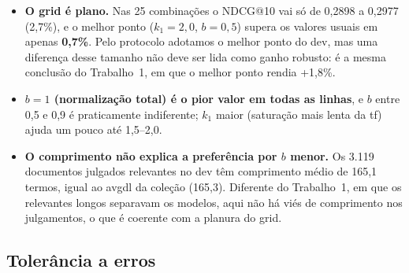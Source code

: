\documentclass[10pt,a4paper]{article}
\begin{document}
\begin{itemize}
\item \textbf{O grid é plano.} Nas 25 combinações o NDCG@10 vai só de 0,2898 a 0,2977 (2,7\%), e o melhor ponto ($k_1 = 2{,}0$, $b = 0{,}5$) supera os valores usuais em apenas \textbf{0,7\%}. Pelo protocolo adotamos o melhor ponto do dev, mas uma diferença desse tamanho não deve ser lida como ganho robusto: é a mesma conclusão do Trabalho~1, em que o melhor ponto rendia +1,8\%.
\item \textbf{$b = 1$ (normalização total) é o pior valor em todas as linhas}, e $b$ entre 0,5 e 0,9 é praticamente indiferente; $k_1$ maior (saturação mais lenta da tf) ajuda um pouco até 1,5--2,0.
\item \textbf{O comprimento não explica a preferência por $b$ menor.} Os 3.119 documentos julgados relevantes no dev têm comprimento médio de 165,1 termos, igual ao avgdl da coleção (165,3). Diferente do Trabalho~1, em que os relevantes longos separavam os modelos, aqui não há viés de comprimento nos julgamentos, o que é coerente com a planura do grid.
\end{itemize}

\subsection{Tolerância a erros}
\label{sec:met-erros}
\end{document}
